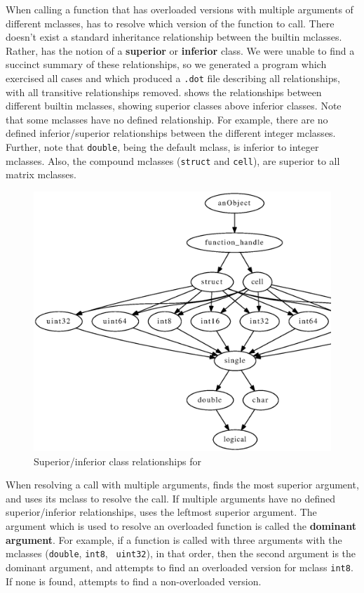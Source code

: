 When calling a function that has overloaded versions with
multiple arguments of different mclasses, \matlab has to resolve which
version of the function to call. There doesn't exist a standard inheritance
relationship between the builtin mclasses. Rather, \matlab has the
notion of a \textbf{superior} or \textbf{inferior} class.   We were
unable to find a succinct summary of these relationships, so we generated a
\matlab program which exercised all cases and which produced a
\texttt{.dot} file describing all relationships, with all transitive
relationships removed.   shows the relationships
between different builtin mclasses, showing superior classes above
inferior classes. Note that some mclasses have no defined relationship.
For example, there are no defined inferior/superior relationships
between the different integer mclasses.
Further, note that {\tt double}, being the default mclass, is inferior to
integer mclasses. Also, the compound mclasses (\lstinline{struct} and 
\lstinline{cell}), are superior to all matrix mclasses.

\begin{figure}[htbp]
\begin{center}
\includegraphics[width=5.2in]{Figures/builtinClassRelationships.eps}
\caption{Superior/inferior class relationships for \matlab}
\label{Fig:Superior}
\end{center}
\end{figure}


When resolving a call with multiple arguments, \matlab finds the most
superior argument, and uses its mclass to resolve the call. If multiple
arguments have no defined superior/inferior relationships, \matlab uses
the leftmost superior argument. The argument which is used to resolve
an overloaded function is called the \textbf{dominant argument}.
For example, if a function is called
with three arguments with the mclasses ({\tt double}, {\tt int8}, {\tt
uint32}), in that order, then the second argument is the dominant argument, 
and \matlab attempts to find an overloaded version
for mclass {\tt int8}. If none is found, \matlab attempts to find a
non-overloaded version.

